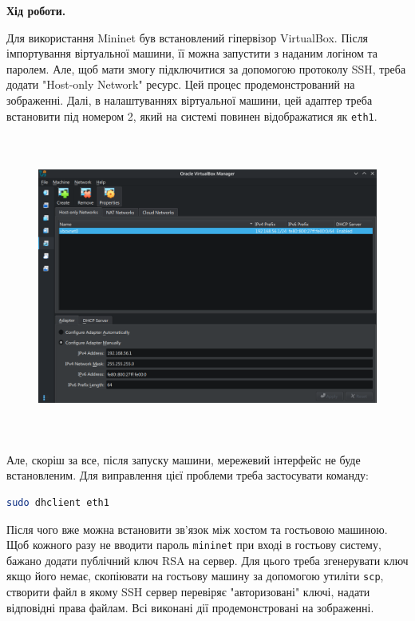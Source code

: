 \documentclass[14pt, a4paper]{extreport}
\begin{document}
	\begin{center}
		\textbf{Хід роботи.}
	\end{center}
	
	Для використання Mininet був встановлений гіпервізор VirtualBox. Після імпортування віртуальної машини, її можна запустити з наданим логіном та паролем. Але, щоб мати змогу підключитися за допомогою протоколу SSH, треба додати "Host-only Network" ресурс. Цей процес продемонстрований на зображенні. Далі, в налаштуваннях віртуальної машини, цей адаптер треба встановити під номером 2, який на системі повинен відображатися як \texttt{eth1}.
	
	\begin{figure}[H]
		\centering
		\includegraphics[height=10cm]{01} 
	\end{figure}
	
	Але, скоріш за все, після запуску машини, мережевий інтерфейс не буде встановленим. Для виправлення цієї проблеми треба застосувати команду:
	
	\begin{lstlisting}[language=Bash]
		sudo dhclient eth1\end{lstlisting}
	
	Після чого вже можна встановити зв'язок між хостом та гостьовою машиною.
	Щоб кожного разу не вводити пароль \texttt{mininet} при вході в гостьову систему, бажано додати публічний ключ RSA на сервер. Для цього треба згенерувати ключ якщо його немає, скопіювати на гостьову машину за допомогою утиліти \texttt{scp}, створити файл в якому SSH сервер перевіряє "авторизовані" ключі, надати відповідні права файлам. Всі виконані дії продемонстровані на зображенні.
		
\end{document}
